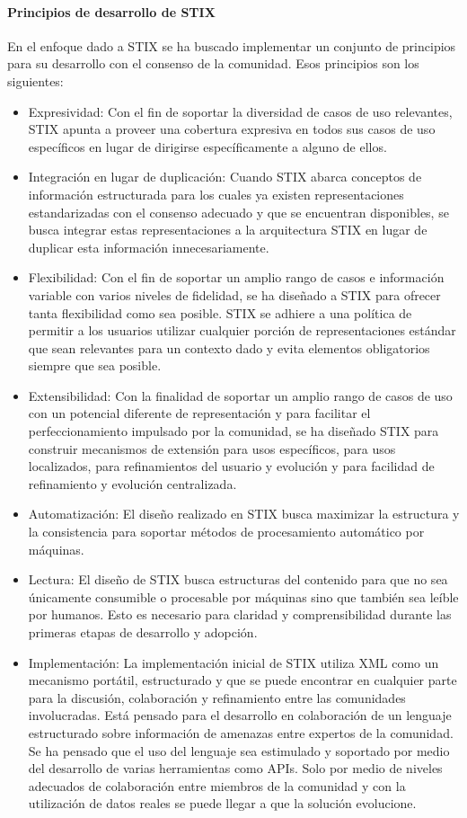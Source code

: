 \paragraph{Principios de desarrollo de STIX}
En el enfoque dado a STIX se ha buscado implementar un conjunto de principios 
para su desarrollo con el consenso de la comunidad. Esos principios son los siguientes:
\begin{itemize}
  \item Expresividad: Con el fin de soportar la diversidad de casos de uso relevantes, STIX apunta a 
proveer una cobertura expresiva en todos sus casos de uso específicos en lugar 
de dirigirse específicamente a alguno de ellos.
  \item Integración en lugar de duplicación: Cuando STIX abarca conceptos de información estructurada para los cuales ya 
existen representaciones estandarizadas con el consenso adecuado y que se 
encuentran disponibles, se busca integrar estas representaciones a la 
arquitectura STIX en lugar de duplicar esta información innecesariamente.
\item Flexibilidad: Con el fin de soportar un amplio rango de casos e información variable con 
varios niveles de fidelidad, se ha diseñado a STIX para ofrecer tanta flexibilidad 
como sea posible. STIX se adhiere a una política de permitir a los usuarios 
utilizar cualquier porción de representaciones estándar que sean relevantes para 
un contexto dado y evita elementos obligatorios siempre que sea posible.
\item Extensibilidad: Con la finalidad de soportar un amplio rango de casos de uso con un potencial 
diferente de representación y para facilitar el perfeccionamiento 
impulsado por la comunidad, se ha diseñado STIX para construir mecanismos de 
extensión para usos específicos, para usos localizados, para refinamientos del 
usuario y evolución y para facilidad de refinamiento y evolución centralizada.
\item Automatización: El diseño realizado en STIX busca maximizar la estructura y la consistencia para 
soportar métodos de procesamiento automático por máquinas.
\item Lectura: El diseño de STIX busca estructuras del contenido para que no sea únicamente 
consumible o procesable por máquinas sino que también sea leíble por humanos. 
Esto es necesario para claridad y comprensibilidad durante las primeras etapas 
de desarrollo y adopción.
\item Implementación: La implementación inicial de STIX utiliza XML como un mecanismo portátil, 
estructurado y que se puede encontrar en cualquier parte para la discusión, 
colaboración y refinamiento entre las comunidades involucradas. Está pensado 
para el desarrollo en colaboración de un lenguaje estructurado sobre información de 
amenazas entre expertos de la comunidad. Se ha pensado que el uso del lenguaje 
sea estimulado y soportado por medio del desarrollo de varias herramientas como 
APIs. Solo por medio de niveles adecuados de colaboración entre miembros de la 
comunidad y con la utilización de datos reales se puede llegar a que la solución 
evolucione.
\end{itemize}










